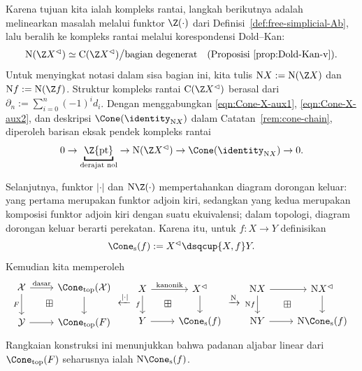 Karena tujuan kita ialah kompleks rantai, langkah berikutnya adalah
melinearkan masalah melalui funktor $\Z(\mathord\cdot)$ dari
Definisi~\ref{def:free-simplicial-Ab}, lalu beralih ke kompleks rantai
melalui korespondensi Dold--Kan:
\begin{equation*}
	\mathrm{N}(\Z X^{\lhd}) \simeq \mathrm{C}(\Z X^{\lhd}) \big/ \text{bagian degenerat} \quad \text{(Proposisi \ref{prop:Dold-Kan-v})}.
\end{equation*}
Untuk menyingkat notasi dalam sisa bagian ini, kita tulis
$\mathrm{N}X:=\mathrm{N}(\Z X)$ dan
$\mathrm{N}f:=\mathrm{N}(\Z f)$. Struktur kompleks rantai
$\mathrm{C}(\Z X^{\lhd})$ berasal dari
$\partial_n:=\sum_{i=0}^n(-1)^id_i$. Dengan menggabungkan
\eqref{eqn:Cone-X-aux1}, \eqref{eqn:Cone-X-aux2}, dan deskripsi
$\Cone(\identity_{\mathrm{N}X})$ dalam Catatan~\ref{rem:cone-chain},
diperoleh barisan eksak pendek kompleks rantai
\[ 0 \to \underbracket{\Z\{\mathrm{pt}\}}_{\text{derajat nol}} \to \mathrm{N}(\Z X^{\lhd}) \to \Cone(\identity_{\mathrm{N}X}) \to 0. \]

Selanjutnya, funktor $|\mathord\cdot|$ dan
$\mathrm{N}\Z(\mathord\cdot)$ mempertahankan diagram dorongan keluar:
yang pertama merupakan funktor adjoin kiri, sedangkan yang kedua merupakan
komposisi funktor adjoin kiri dengan suatu ekuivalensi; dalam topologi, diagram dorongan keluar
berarti perekatan. Karena itu, untuk $f:X\to Y$ definisikan
\begin{equation*}
	\Cone_{\mathrm{s}}(f) := X^{\lhd} \dsqcup{X, f} Y.
\end{equation*}
Kemudian kita memperoleh
\[\begin{tikzcd}
	\mathcal{X} \arrow[d, "F"'] \arrow[r, "{\text{dasar}}"] & \Cone_{\mathrm{top}}(\mathcal{X}) \arrow[d] \\
	\mathcal{Y} \arrow[r] & \Cone_{\mathrm{top}}(F) \arrow[phantom, lu, "\boxplus" description]
\end{tikzcd} \xleftarrow{|\cdot|} \begin{tikzcd}
	X \arrow[d, "f"'] \arrow[r, "\text{kanonik}"] & X^{\lhd} \arrow[d] \\
	Y \arrow[r] & \Cone_{\mathrm{s}}(f) \arrow[phantom, lu, "\boxplus" description]
\end{tikzcd} \xrightarrow{\mathrm{N}} \begin{tikzcd}
	\mathrm{N}X \arrow[d, "{\mathrm{N}f}"'] \arrow[r] & \mathrm{N}X^{\lhd} \arrow[d] \\
	\mathrm{N}Y \arrow[r] & \mathrm{N}\Cone_{\mathrm{s}}(f) \arrow[phantom, lu, "\boxplus" description]
\end{tikzcd}\]
Rangkaian konstruksi ini menunjukkan bahwa padanan aljabar linear dari
$\Cone_{\mathrm{top}}(F)$ seharusnya ialah
$\mathrm{N}\Cone_{\mathrm{s}}(f)$.

